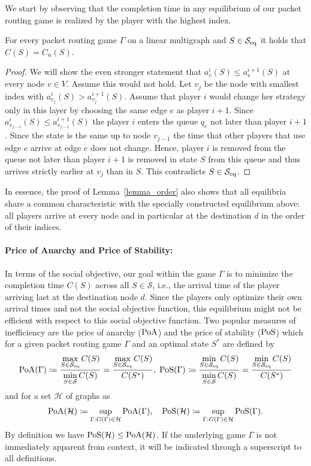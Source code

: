 We start by observing that the completion time in any equilibrium of our packet routing game is realized by the player with the highest index. 
\begin{lemma}\label{lemma_order}
    For every packet routing game $\Gamma$ on a linear multigraph and $S\in \mathcal{S}_{\operatorname{eq}}$ it holds that $C(S)= C_n(S)$. 
\end{lemma}
\begin{proof}
We will show the even stronger statement that $a_{v}^i(S)\leq a_{v}^{i+1}(S)$ at every node $v\in V$. Assume this would not hold. Let $v_j$ be the node with smallest index with $a_{v_j}^i(S)> a_{v_j}^{i+1}(S)$. Assume that player $i$ would change her strategy only in this layer by choosing the same edge $e$ as player $i+1$. Since $a_{v_{j-1}}^i(S)\leq a_{v_{j-1}}^{i+1}(S)$ the player $i$ enters the queue $q_e$ not later than player $i+1$. Since the state is the same up to node $v_{j-1}$ the time that other players that use edge $e$ arrive at edge $e$ does not change. Hence, player $i$ is removed from the queue not later than player $i+1$ is removed in state $S$ from this queue and thus arrives strictly earlier at $v_j$ than in $S$. This contradicts $S\in \mathcal{S}_{\operatorname{eq}}$.
\end{proof}
\noindent In essence, the proof of Lemma~\ref{lemma_order} also shows that all equilibria share a common characteristic with the specially constructed equilibrium above: all players arrive at every node and in particular at the destination $d$ in the order of their indices.

\paragraph{Price of Anarchy and Price of Stability:}
In terms of the social objective, our goal within the game $\Gamma$ is to minimize the completion time $C(S)$ across all $S\in \mathcal{S}$, i.e., the arrival time of the player arriving last at the destination node $d$. Since the players only optimize their own arrival times and not the social objective function, this equilibrium might not be efficient with respect to this social objective function.
Two popular measures of inefficiency are the price of anarchy ($\operatorname*{PoA}$) and the price of stability ($\operatorname*{PoS}$) which for a given packet routing game $\Gamma$ and an optimal state $S^*$ are defined by
\begin{align*}
    \operatorname*{PoA}(\Gamma) \coloneqq \frac{\max\limits_{S \in \mathcal{S}_{\operatorname{eq}}} C(S)}{\min\limits_{S \in \mathcal{S}} C(S)} =\frac{\max\limits_{S \in \mathcal{S}_{\operatorname{eq}}} C(S)}{C(S^*)}, \; \operatorname*{PoS}(\Gamma) \coloneqq \frac{\min\limits_{S \in \mathcal{S}_{\operatorname{eq}}} C(S)}{\min\limits_{S \in \mathcal{S}} C(S)} =\frac{\min\limits_{S \in \mathcal{S}_{\operatorname{eq}}} C(S)}{C(S^*)}
\end{align*}
and for a set $\mathcal{H}$ of graphs as
\begin{align*}
    \operatorname*{PoA}(\mathcal{H}) \coloneqq \sup\limits_{\Gamma: G(\Gamma) \in \mathcal{H}} \operatorname*{PoA}(\Gamma), \quad \operatorname*{PoS}(\mathcal{H}) \coloneqq \sup\limits_{\Gamma: G(\Gamma) \in \mathcal{H}} \operatorname*{PoS}(\Gamma).
\end{align*}
By definition we have $\operatorname*{PoS}(\mathcal{H})\leq \operatorname*{PoA}(\mathcal{H})$.
If the underlying game $\Gamma$ is not immediately apparent from context, it will be indicated through a superscript to all definitions.